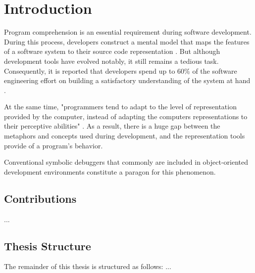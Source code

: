 \chapter{Introduction}
\label{c:introduction}

Program comprehension is an essential requirement during software development.
During this process, developers construct a mental model that maps the features of a software system to their source code representation \cite{latoza_maintaining_2006}.
But although development tools have evolved notably, it still remains a tedious task.
Consequently, it is reported that developers spend up to 60\% of the software engineering effort on building a satisfactory understanding of the system at hand \cite{corbi_program_1989, basili_evolving_1997, cornelissen_execution_2008}.

At the same time, "programmers tend to adapt to the level of representation
provided by the computer, instead of adapting the computers representations
to their perceptive abilities" \cite{diehl_software_2007}.
As a result, there is a huge gap between the metaphors and concepts used during development, and the representation tools provide of a program's behavior.

Conventional symbolic debuggers that commonly are included in object-oriented development environments constitute a paragon for this phenomenon.


\section{Contributions}
\label{s:contributions}

\begin{description}[leftmargin=0pt]
\item[First Contribution]
...
\end{description}



\section{Thesis Structure}
\label{s:structure}

The remainder of this thesis is structured as follows:
...

% 
% 